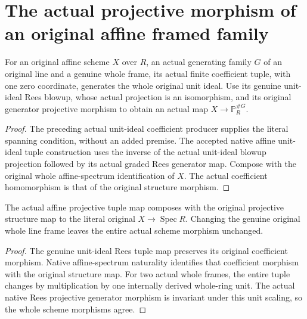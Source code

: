 \section{The actual projective morphism of an original affine framed family}

\begin{definition}
\label{def:fc-generated-line-projective-affine-map}
\leanok
{}
For an original affine scheme $X$ over $R$, an actual generating
family $G$ of an original line and a genuine whole frame, its actual
finite coefficient tuple, with one zero coordinate, generates the
whole original unit ideal. Use its genuine unit-ideal Rees blowup,
whose actual projection is an isomorphism, and its original generator
projective morphism to obtain an actual map
$X\to\mathbb P_R^{\#G}$.
\end{definition}
\begin{proof}
The preceding actual unit-ideal coefficient producer supplies the
literal spanning condition, without an added premise. The accepted
native affine unit-ideal tuple construction uses the inverse of the
actual unit-ideal blowup projection followed by its actual graded
Rees generator map. Compose with the original whole affine-spectrum
identification of $X$. The actual coefficient homomorphism is that
of the original structure morphism.
\end{proof}

\begin{theorem}
\label{thm:fc-generated-line-projective-affine-frame-independence}
\leanok
{}
The actual affine projective tuple map composes with the original
projective structure map to the literal original $X\to\operatorname{Spec}R$.
Changing the genuine original whole line frame leaves the entire
actual scheme morphism unchanged.
\end{theorem}
\begin{proof}
The genuine unit-ideal Rees tuple map preserves its original
coefficient morphism. Native affine-spectrum naturality identifies
that coefficient morphism with the original structure map. For two
actual whole frames, the entire tuple changes by multiplication by
one internally derived whole-ring unit. The actual native Rees
projective generator morphism is invariant under this unit scaling,
so the whole scheme morphisms agree.
\end{proof}

